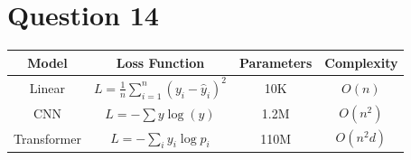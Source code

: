 \documentclass[12pt,a4paper]{article}
\renewcommand{\arraystretch}{1.25}
\begin{document}
\section*{Question 14}
\begin{center}
\renewcommand{\arraystretch}{1.7}
\begin{tabular}{|c|c|c|c|}
\hline
\textbf{Model} & \textbf{Loss Function} & \textbf{Parameters} & \textbf{Complexity}\\
\hline
Linear &
$\displaystyle L=\frac{1}{n}\sum_{i=1}^{n}(y_i-\hat{y}_i)^2$ &
10K & $O(n)$\\
\hline
CNN &
$\displaystyle L=-\sum y\log(\hat{y})$ &
1.2M & $O(n^2)$\\
\hline
Transformer &
$\displaystyle L=-\sum_i y_i\log p_i$ &
110M & $O(n^2d)$\\
\hline
\end{tabular}
\end{center}
\end{document}
